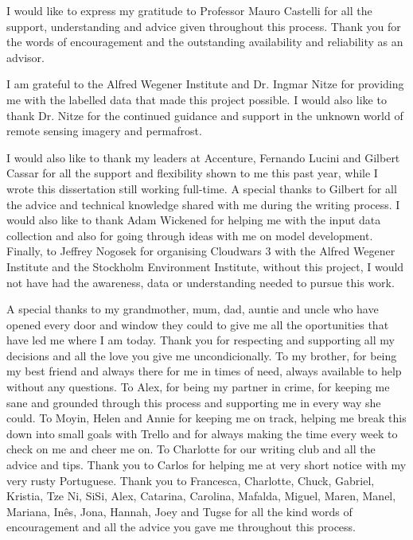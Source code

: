

\begin{ntacknowledgements}

I would like to express my gratitude to Professor Mauro Castelli for all the support, understanding and advice given throughout this process. Thank you for the words of encouragement and the outstanding availability and reliability as an advisor.

I am grateful to the Alfred Wegener Institute and Dr. Ingmar Nitze for providing me with the labelled data that made this project possible. I would also like to thank Dr. Nitze for the continued guidance and support in the unknown world of remote sensing imagery and permafrost.

I would also like to thank my leaders at Accenture, Fernando Lucini and Gilbert Cassar for all the support and flexibility shown to me this past year, while I wrote this dissertation still working full-time. A special thanks to Gilbert for all the advice and technical knowledge shared with me during the writing process. I would also like to thank Adam Wickened for helping me with the input data collection and also for going through ideas with me on model development. Finally, to Jeffrey Nogosek for organising Cloudwars 3 with the Alfred Wegener Institute and the Stockholm Environment Institute, without this project, I would not have had the awareness, data or understanding needed to pursue this work.

A special thanks to my grandmother, mum, dad, auntie and uncle who have opened every door and window they could to give me all the oportunities that have led me where I am today. Thank you for respecting and supporting all my decisions and all the love you give me uncondicionally. To my brother, for being my best friend and always there for me in times of need, always available to help without any questions. To Alex, for being my partner in crime, for keeping me sane and grounded through this process and supporting me in every way she could. To Moyin, Helen and Annie for keeping me on track, helping me break this down into small goals with Trello and  for always making the time every week to check on me and cheer me on. To Charlotte for our writing club and all the advice and tips. Thank you to Carlos for helping me at very short notice with my very rusty Portuguese. Thank you to Francesca, Charlotte, Chuck, Gabriel, Kristia, Tze Ni, SiSi, Alex, Catarina, Carolina, Mafalda, Miguel, Maren, Manel, Mariana, Inês, Jona, Hannah, Joey and Tugse for all the kind words of encouragement and all the advice you gave me throughout this process.


\end{ntacknowledgements}
